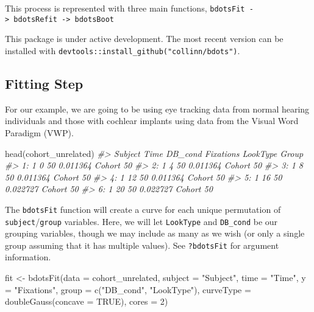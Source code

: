 \documentclass[
]{article}
\newenvironment{Shaded}{\begin{snugshade}}{\end{snugshade}}
\newcommand{\AttributeTok}[1]{\textcolor[rgb]{0.77,0.63,0.00}{#1}}
\newcommand{\CommentTok}[1]{\textcolor[rgb]{0.56,0.35,0.01}{\textit{#1}}}
\newcommand{\ConstantTok}[1]{\textcolor[rgb]{0.00,0.00,0.00}{#1}}
\newcommand{\DecValTok}[1]{\textcolor[rgb]{0.00,0.00,0.81}{#1}}
\newcommand{\FunctionTok}[1]{\textcolor[rgb]{0.00,0.00,0.00}{#1}}
\newcommand{\NormalTok}[1]{#1}
\newcommand{\OtherTok}[1]{\textcolor[rgb]{0.56,0.35,0.01}{#1}}
\newcommand{\StringTok}[1]{\textcolor[rgb]{0.31,0.60,0.02}{#1}}
\begin{document}
This process is represented with three main functions,
\texttt{bdotsFit\ -\textgreater{}\ bdotsRefit\ -\textgreater{}\ bdotsBoot}

This package is under active development. The most recent version can be
installed with \texttt{devtools::install\_github("collinn/bdots")}.

\hypertarget{fitting-step}{%
\subsection{Fitting Step}\label{fitting-step}}

For our example, we are going to be using eye tracking data from normal
hearing individuals and those with cochlear implants using data from the
Visual Word Paradigm (VWP).

\begin{Shaded}
\begin{Highlighting}[]
\FunctionTok{head}\NormalTok{(cohort\_unrelated)}
\CommentTok{\#\textgreater{}    Subject Time DB\_cond Fixations LookType Group}
\CommentTok{\#\textgreater{} 1:       1    0      50  0.011364   Cohort    50}
\CommentTok{\#\textgreater{} 2:       1    4      50  0.011364   Cohort    50}
\CommentTok{\#\textgreater{} 3:       1    8      50  0.011364   Cohort    50}
\CommentTok{\#\textgreater{} 4:       1   12      50  0.011364   Cohort    50}
\CommentTok{\#\textgreater{} 5:       1   16      50  0.022727   Cohort    50}
\CommentTok{\#\textgreater{} 6:       1   20      50  0.022727   Cohort    50}
\end{Highlighting}
\end{Shaded}

The \texttt{bdotsFit} function will create a curve for each unique
permutation of \texttt{subject}/\texttt{group} variables. Here, we will
let \texttt{LookType} and \texttt{DB\_cond} be our grouping variables,
though we may include as many as we wish (or only a single group
assuming that it has multiple values). See \texttt{?bdotsFit} for
argument information.

\begin{Shaded}
\begin{Highlighting}[]
\NormalTok{fit }\OtherTok{\textless{}{-}} \FunctionTok{bdotsFit}\NormalTok{(}\AttributeTok{data =}\NormalTok{ cohort\_unrelated,}
                \AttributeTok{subject =} \StringTok{"Subject"}\NormalTok{,}
                \AttributeTok{time =} \StringTok{"Time"}\NormalTok{,}
                \AttributeTok{y =} \StringTok{"Fixations"}\NormalTok{,}
                \AttributeTok{group =} \FunctionTok{c}\NormalTok{(}\StringTok{"DB\_cond"}\NormalTok{, }\StringTok{"LookType"}\NormalTok{),}
                \AttributeTok{curveType =} \FunctionTok{doubleGauss}\NormalTok{(}\AttributeTok{concave =} \ConstantTok{TRUE}\NormalTok{),}
                \AttributeTok{cores =} \DecValTok{2}\NormalTok{)}
\end{Highlighting}
\end{Shaded}
\end{document}
